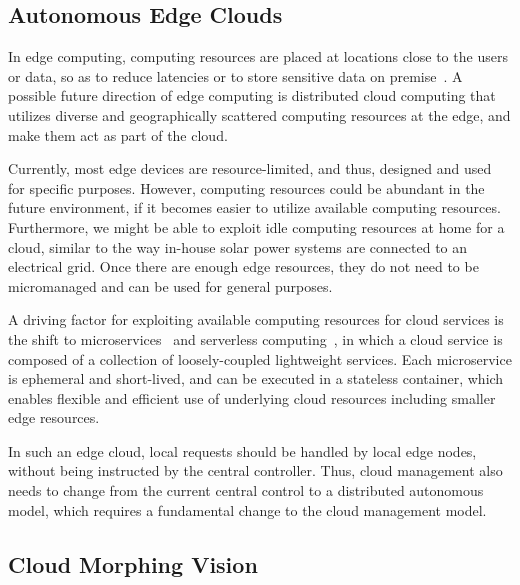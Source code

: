 \subsection{Autonomous Edge Clouds}

In edge computing, computing resources are placed at locations close
to the users or data, so as to reduce latencies or to store sensitive
data on premise~\cite{Lopez-2015}.
A possible future direction of edge computing is distributed cloud
computing that utilizes diverse and geographically scattered computing
resources at the edge, and make them act as part of the cloud.

Currently, most edge devices are resource-limited, and thus, designed
and used for specific purposes.
However, computing resources could be abundant in the future environment,
if it becomes easier to utilize available computing resources.
Furthermore, we might be able to exploit idle computing resources at
home for a cloud, similar to the way in-house solar power systems are
connected to an electrical grid.
Once there are enough edge resources, they do not need to be
micromanaged and can be used for general purposes.

A driving factor for exploiting available computing resources for cloud
services is the shift to microservices~\cite{nadareishvili2016microservice}
and serverless computing~\cite{Shafiei-2022},
in which a cloud service is composed of a collection of loosely-coupled
lightweight services.
Each microservice is ephemeral and short-lived, and can be executed
in a stateless container,
which enables flexible and efficient use of underlying cloud
resources including smaller edge resources.

In such an edge cloud, local requests should be handled by local edge
nodes, without being instructed by the central controller.
Thus, cloud management also needs to change from the current central
control to a distributed autonomous model, which requires a
fundamental change to the cloud management model.

\subsection{Cloud Morphing Vision}

